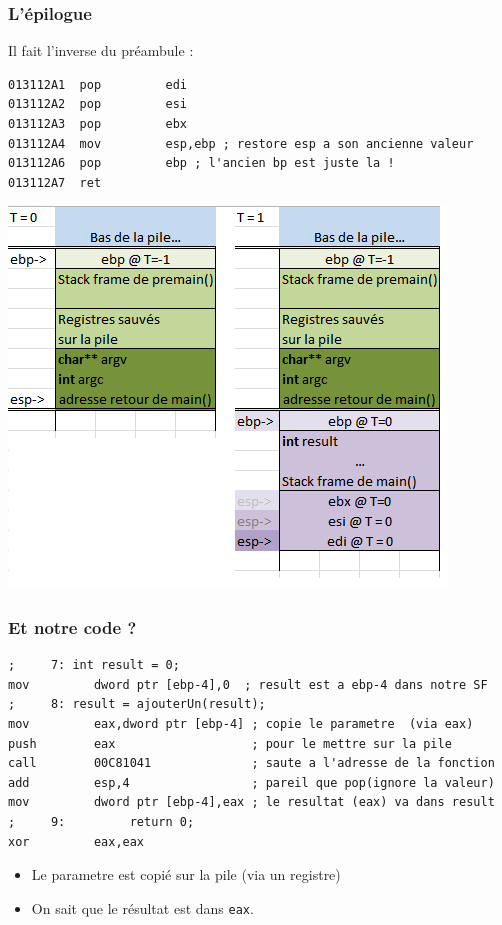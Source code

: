 \documentclass{beamer}
\begin{document}
\begin{frame}[fragile]
\frametitle{L'épilogue}
Il fait l'inverse du préambule :
\begin{lstlisting}[language={[x86masm]Assembler}, basicstyle={\scriptsize\ttfamily}]
013112A1  pop         edi
013112A2  pop         esi
013112A3  pop         ebx
013112A4  mov         esp,ebp ; restore esp a son ancienne valeur
013112A6  pop         ebp ; l'ancien bp est juste la !
013112A7  ret
\end{lstlisting}
\includegraphics[scale=0.5]{stack_01.png}
\end{frame}

\begin{frame}[fragile]
\frametitle{Et notre code ?}
\begin{lstlisting}[language={[x86masm]Assembler}, basicstyle={\scriptsize\ttfamily}]
;     7: int result = 0;
mov         dword ptr [ebp-4],0  ; result est a ebp-4 dans notre SF 
;     8: result = ajouterUn(result);
mov         eax,dword ptr [ebp-4] ; copie le parametre  (via eax)
push        eax                   ; pour le mettre sur la pile 
call        00C81041              ; saute a l'adresse de la fonction
add         esp,4                 ; pareil que pop(ignore la valeur)
mov         dword ptr [ebp-4],eax ; le resultat (eax) va dans result
;     9:         return 0;
xor         eax,eax  
\end{lstlisting}
\begin{itemize}
\item Le parametre est copié sur la pile (via un registre)
\item On sait que le résultat est dans \texttt{eax}.
\end{itemize}
\end{frame}
\end{document}

